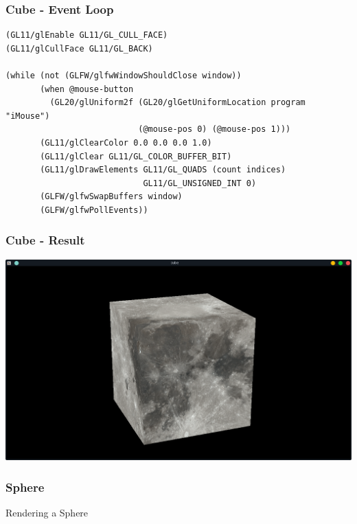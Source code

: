 \documentclass[aspectratio=169,11pt,xcolor=dvipsnames]{beamer}
\begin{document}
\begin{frame}[fragile]
  \frametitle{Cube {-} Event Loop}
  \begin{verbatim}
(GL11/glEnable GL11/GL_CULL_FACE)
(GL11/glCullFace GL11/GL_BACK)

(while (not (GLFW/glfwWindowShouldClose window))
       (when @mouse-button
         (GL20/glUniform2f (GL20/glGetUniformLocation program "iMouse")
                           (@mouse-pos 0) (@mouse-pos 1)))
       (GL11/glClearColor 0.0 0.0 0.0 1.0)
       (GL11/glClear GL11/GL_COLOR_BUFFER_BIT)
       (GL11/glDrawElements GL11/GL_QUADS (count indices)
                            GL11/GL_UNSIGNED_INT 0)
       (GLFW/glfwSwapBuffers window)
       (GLFW/glfwPollEvents))
  \end{verbatim}
\end{frame}

\begin{frame}
  \frametitle{Cube {-} Result}
  \begin{center}
    \includegraphics[width=.8\textwidth]{cube}
  \end{center}
\end{frame}

\begin{frame}
  \frametitle{Sphere}
  \begin{center}
    \begin{huge}
      Rendering a Sphere
    \end{huge}
  \end{center}
\end{frame}
\end{document}

